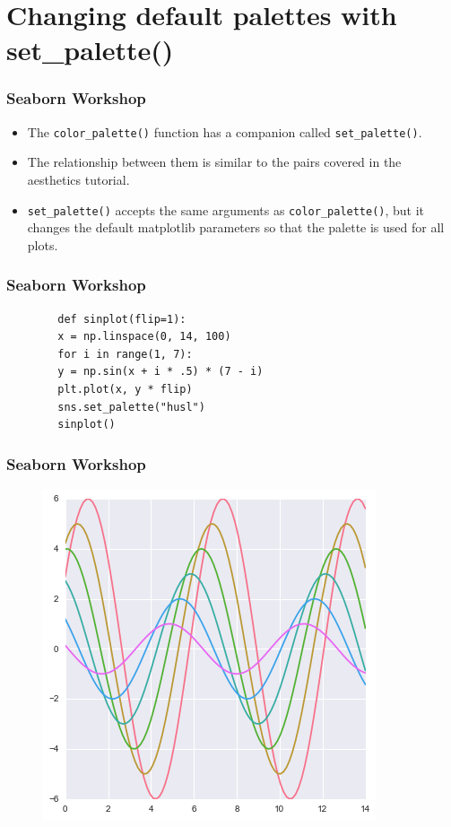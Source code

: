 \documentclass{beamer}
\begin{document}
\section{Changing default palettes with set\_palette()}
\begin{frame}[fragile]
	\frametitle{Seaborn Workshop}
	\large
	\begin{itemize}
		\item The \texttt{color\_palette()} function has a companion called \texttt{set\_palette()}. 
		\item The relationship between them is similar to the pairs covered in the aesthetics tutorial. 
		\item \texttt{set\_palette()} accepts the same arguments as \texttt{color\_palette()}, but it changes the default matplotlib parameters so that the palette is used for all plots.
	\end{itemize}
	
\end{frame}
\begin{frame}[fragile]
	\frametitle{Seaborn Workshop}
	\Large
	\begin{framed}
		\begin{verbatim}
		def sinplot(flip=1):
		x = np.linspace(0, 14, 100)
		for i in range(1, 7):
		y = np.sin(x + i * .5) * (7 - i)
		plt.plot(x, y * flip)
		sns.set_palette("husl")
		sinplot()
		\end{verbatim}
	\end{framed}
	
\end{frame}
\begin{frame}[fragile]
	\frametitle{Seaborn Workshop}
	\large
	
	
	\begin{figure}
		\centering
		\includegraphics[width=0.7\linewidth]{images/color_palettes_67_0}
	\end{figure}
	
\end{frame}
\end{document}

